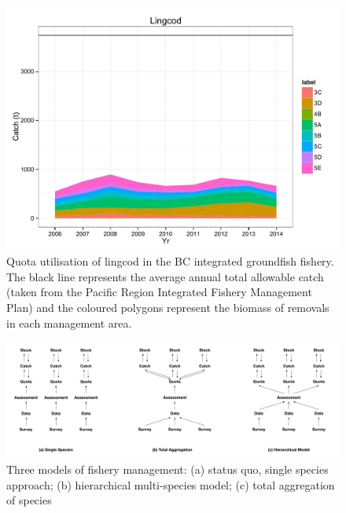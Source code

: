 \documentclass[]{scrartcl}
\begin{document}
\newpage

\begin{figure}[htbp]
\begin{center}
\includegraphics{figures/lingcod.pdf}
\caption{Quota utilisation of lingcod in the BC integrated groundfish fishery. The black line represents the average annual total allowable catch (taken from the Pacific Region Integrated Fishery Management Plan) and the coloured polygons represent the biomass of removals in each management area.}\label{fig:lingcod}
\end{center}
\end{figure}

\newpage

\begin{landscape}
\begin{figure}[htbp]
\begin{center}
\includegraphics{figures/msFishery.pdf}
\caption{Three models of fishery management: (a) status quo,
single species approach; (b) hierarchical multi-species model; (c) total aggregation of species}\label{fig:3Models}
\end{center}
\end{figure}
\end{landscape}
\end{document}
